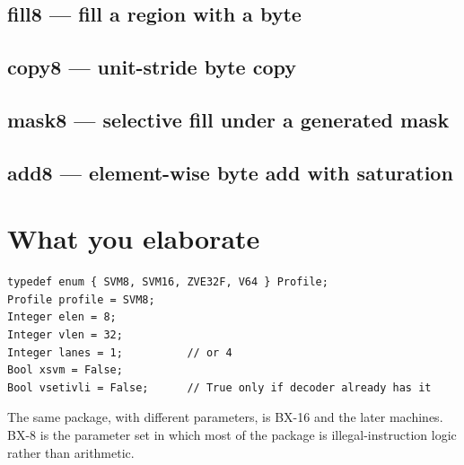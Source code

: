 

\subsection{fill8 --- fill a region with a byte}


\subsection{copy8 --- unit-stride byte copy}


\subsection{mask8 --- selective fill under a generated mask}


\subsection{add8 --- element-wise byte add with saturation}


\section{What you elaborate}

\begin{lstlisting}
typedef enum { SVM8, SVM16, ZVE32F, V64 } Profile;
Profile profile = SVM8;
Integer elen = 8;
Integer vlen = 32;
Integer lanes = 1;          // or 4
Bool xsvm = False;
Bool vsetivli = False;      // True only if decoder already has it
\end{lstlisting}

The same package, with different parameters, is BX-16 and the later machines. BX-8 is the parameter set in which most of the package is illegal-instruction logic rather than arithmetic.
